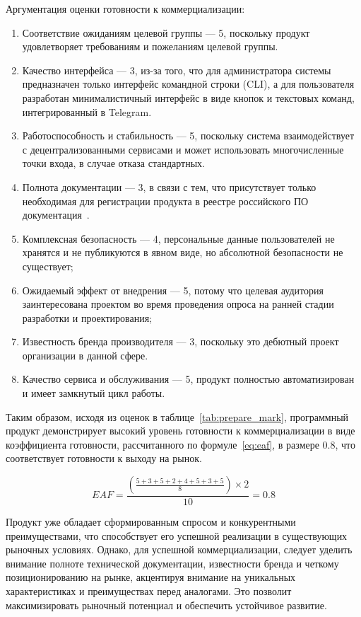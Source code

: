 Аргументация оценки готовности к коммерциализации:
\begin{enumerate}
    \item Соответствие ожиданиям целевой группы --- 5, поскольку продукт удовлетворяет требованиям и пожеланиям целевой группы.
    \item Качество интерфейса --- 3, из-за того, что для администратора системы предназначен только интерфейс командной строки (CLI), а для пользователя разработан минималистичный интерфейс в виде кнопок и текстовых команд, интегрированный в Telegram.
    \item Работоспособность и стабильность --- 5, поскольку система взаимодействует с децентрализованными сервисами и может использовать многочисленные точки входа, в случае отказа стандартных.
    \item Полнота документации --- 3, в связи с тем, что присутствует только необходимая для регистрации продукта в реестре российского ПО документация~\cite{bib:reestrpo_docs}.
    \item Комплексная безопасность --- 4, персональные данные пользователей не хранятся и не публикуются в явном виде, но абсолютной безопасности не существует;
    \item Ожидаемый эффект от внедрения --- 5, потому что целевая аудитория заинтересована проектом во время проведения опроса на ранней стадии разработки и проектирования;
    \item Известность бренда производителя --- 3, поскольку это дебютный проект организации в данной сфере.
    \item Качество сервиса и обслуживания --- 5, продукт полностью автоматизирован и имеет замкнутый цикл работы.
\end{enumerate}

Таким образом, исходя из оценок в таблице~\ref{tab:prepare_mark}, программный продукт демонстрирует высокий уровень готовности к коммерциализации в виде коэффициента готовности, рассчитанного по формуле~\ref{eq:eaf}, в размере 0.8, что соответствует готовности к выходу на рынок.

$$EAF = \frac{\left(\frac{5 + 3 + 5 + 2 + 4 + 5 + 3 + 5}{8}\right) \times 2}{10} = 0.8$$

Продукт уже обладает сформированным спросом и конкурентными преимуществами, что способствует его успешной реализации в существующих рыночных условиях. Однако, для успешной коммерциализации, следует уделить внимание полноте технической документации, известности бренда и четкому позиционированию на рынке, акцентируя внимание на уникальных характеристиках и преимуществах перед аналогами. Это позволит максимизировать рыночный потенциал и обеспечить устойчивое развитие.

